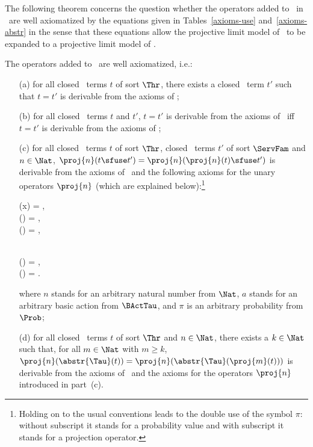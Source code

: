 \documentclass{llncs}
\begin{document}
The following theorem concerns the question whether the operators added
to \prBTA\ in \prTSI\ are well axiomatized by the equations given in 
Tables~\ref{axioms-use} and~\ref{axioms-abstr} in the sense that these 
equations allow the projective limit model of \prBTA\ to be expanded to
a projective limit model of \prTSI.
\begin{theorem}
\label{theorem-use}
The operators added to \prBTA\ are well axiomatized, i.e.:
\begin{enumerate}
\item[(a)]
for all closed \prTSI\ terms $t$ of sort $\Thr$, there exists a closed 
\prBTA\ term $t'$ such that $t = t'$ is derivable from the axioms of 
\prTSI;
\item[(b)]
for all closed \prBTA\ terms $t$ and $t'$,
$t = t'$ is derivable from the axioms of \prBTA\ iff
$t = t'$ is derivable from the axioms of \prTSI;
\item[(c)]
for all closed \prTSI\ terms $t$ of sort $\Thr$, closed \prTSI\ terms 
$t'$ of sort $\ServFam$ and $n \in \Nat$, 
$\proj{n}(t \sfuse t') = \proj{n}(\proj{n}(t) \sfuse t')$ is derivable 
from the axioms of \prTSI\ and the following axioms for the unary 
operators $\proj{n}$ (which are explained below):\footnote
{Holding on to the usual conventions leads to the double use of the 
symbol $\pi$: without subscript it stands for a probability value 
and with subscript it stands for a projection operator.}
\begin{ldispl}
\begin{geqns}
(x) = \DeadEnd\;,                                             \\
(\DeadEnd) = \DeadEnd\;,                                    \\
(\Stop) = \Stop\;,                                          \\
\end{geqns}
\quad\;\;
\begin{geqns}
{} \\
() = \;,      \\
() = \;. 
\end{geqns}
\end{ldispl}where $n$ stands for an arbitrary natural number from $\Nat$, $a$ stands
for an arbitrary basic action from $\BActTau$, and $\pi$ is an arbitrary
probability from $\Prob$;
\item[(d)]
for all closed \prTSI\ terms $t$ of sort $\Thr$ and $n \in \Nat$, there 
exists a $k \in \Nat$ such that, for all $m \in \Nat$ with $m \geq k$, 
$\proj{n}(\abstr{\Tau}(t)) = \proj{n}(\abstr{\Tau}(\proj{m}(t)))$ 
is derivable from the axioms of \prTSI\ and the axioms for the operators 
$\proj{n}$ introduced in part~(c).
\end{enumerate}
\end{theorem}
\end{document}
